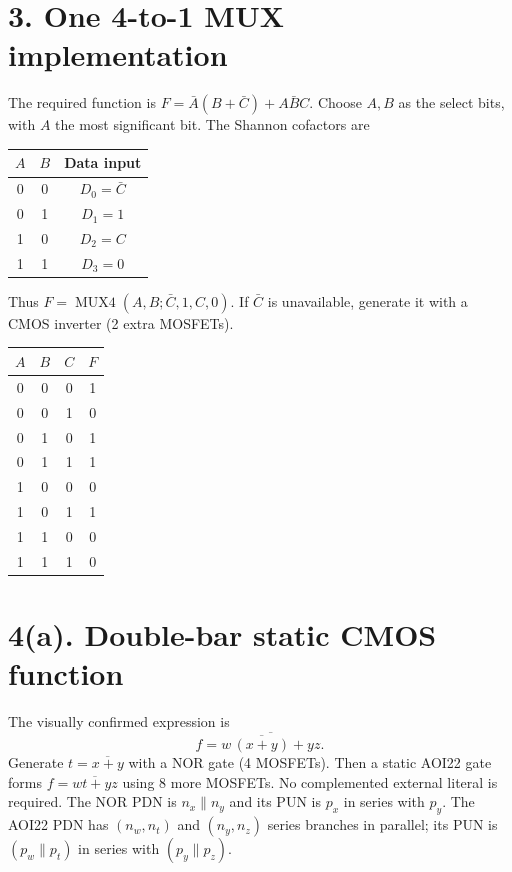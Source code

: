 \documentclass[11pt]{article}
\begin{document}
\newpage\section*{3. One 4-to-1 MUX implementation}
The required function is $F=\bar A(B+\bar C)+A\bar BC$. Choose $A,B$ as the select bits, with $A$ the most significant bit. The Shannon cofactors are
\begin{center}\begin{tabular}{cc|c}\toprule $A$&$B$&Data input\\\midrule
0&0&$D_0=\bar C$\\0&1&$D_1=1$\\1&0&$D_2=C$\\1&1&$D_3=0$\\\bottomrule\end{tabular}\end{center}
Thus $F=\operatorname{MUX4}(A,B;\bar C,1,C,0)$. If $\bar C$ is unavailable, generate it with a CMOS inverter (2 extra MOSFETs).
\begin{center}\end{center}
\begin{center}\begin{tabular}{ccc|c}\toprule $A$&$B$&$C$&$F$\\\midrule
0&0&0&1\\0&0&1&0\\0&1&0&1\\0&1&1&1\\1&0&0&0\\1&0&1&1\\1&1&0&0\\1&1&1&0\\\bottomrule\end{tabular}\end{center}

\newpage\section*{4(a). Double-bar static CMOS function}
The visually confirmed expression is
\[
\boxed{f=\overline{w\,\overline{(x+y)}+yz}.}
\]
Generate $t=\overline{x+y}$ with a NOR gate (4 MOSFETs). Then a static AOI22 gate forms $f=\overline{wt+yz}$ using 8 more MOSFETs. No complemented external literal is required. The NOR PDN is $n_x\parallel n_y$ and its PUN is $p_x$ in series with $p_y$. The AOI22 PDN has $(n_w,n_t)$ and $(n_y,n_z)$ series branches in parallel; its PUN is $(p_w\parallel p_t)$ in series with $(p_y\parallel p_z)$.
\end{document}
